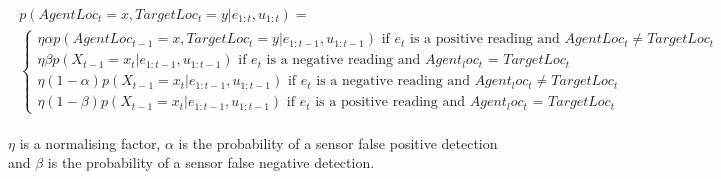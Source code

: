     \begin{center}
    \begin{align}
    \begin{split}
        p(AgentLoc_t = x, TargetLoc_t = y | e_{1:t}, u_{1:t}) = &\\
       \begin{cases}
            \eta \alpha p(AgentLoc_{t-1} = x, TargetLoc_t = y | e_{1:t-1}, u_{1:t-1}) \text{ if $e_t$ is a positive reading and $AgentLoc_t \neq TargetLoc_t$} \\
            \eta \beta p(X_{t-1}=x_t | e_{1:t-1}, u_{1:t-1}) \text{ if $e_t$ is a negative reading and $Agent_loc_t$ = $TargetLoc_t$} \\
            \eta (1-\alpha) p(X_{t-1}=x_t | e_{1:t-1}, u_{1:t-1}) \text{ if $e_t$ is a negative reading and $Agent_loc_t \neq TargetLoc_t$} \\
            \eta (1-\beta) p(X_{t-1}=x_t | e_{1:t-1}, u_{1:t-1}) \text{ if $e_t$ is a positive reading and $Agent_loc_t$ = $TargetLoc_t$}
    \end{cases}
    \end{split}
    \end{align}
    \end{center}
\normalsize

$\eta$ is a normalising factor, $\alpha$ is the probability of a sensor false positive detection and $\beta$ is the probability of a sensor false negative detection.